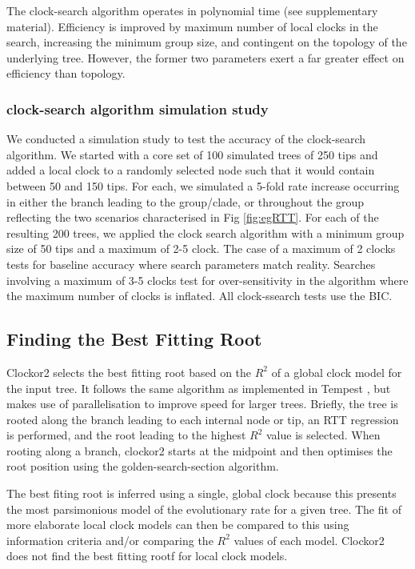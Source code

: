 \documentclass{article}
\begin{document}
The clock-search algorithm operates in polynomial time (see supplementary material). Efficiency is improved by maximum number of local clocks in the search, increasing the minimum group size, and contingent on the topology of the underlying tree. However, the former two parameters exert a far greater effect on efficiency than topology.

\subsubsection*{clock-search algorithm simulation study}
We conducted a simulation study to test the accuracy of the clock-search algorithm. We started with a core set of 100 simulated trees of 250 tips and added a local clock to a randomly selected node such that it would contain between 50 and 150 tips. For each, we simulated a 5-fold rate increase occurring in either the branch leading to the group/clade, or throughout the group reflecting the two scenarios characterised in Fig \ref{fig:egRTT}. For each of the resulting 200 trees, we applied the clock search algorithm with a minimum group size of 50 tips and a maximum of 2-5 clock. The case of a maximum of 2 clocks tests for baseline accuracy where search parameters match reality. Searches involving a maximum of 3-5 clocks test for over-sensitivity in the algorithm where the maximum number of clocks is inflated. All clock-ssearch tests use the BIC.


\subsection*{Finding the Best Fitting Root}
Clockor2 selects the best fitting root based on the $R^2$ of a global clock model for the input tree. It follows the same algorithm as implemented in Tempest \citet{rambaut_exploring_2016}, but makes use of parallelisation to improve speed for larger trees. Briefly, the tree is rooted along the branch leading to each internal node or tip, an RTT regression is performed, and the root leading to the highest $R^2$ value is selected. When rooting along a branch, clockor2 starts at the midpoint and then optimises the root position using the golden-search-section algorithm.

The best fiting root is inferred using a single, global clock because this presents the most parsimonious model of the evolutionary rate for a given tree. The fit of more elaborate local clock models can then be compared to this using information criteria and/or comparing the $R^2$ values of each model. Clockor2 does not find the best fitting rootf for local clock models.
\end{document}
